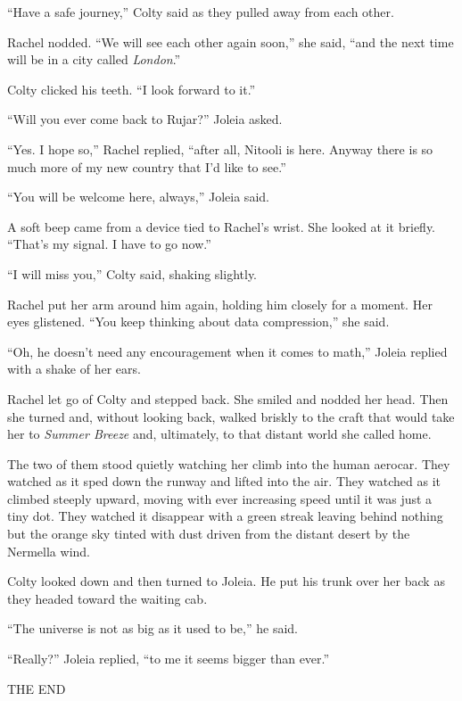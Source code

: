 ``Have a safe journey,'' Colty said as they pulled away from each other.

Rachel nodded. ``We will see each other again soon,'' she said, ``and the next time will be in a
city called \textit{London}.''

Colty clicked his teeth. ``I look forward to it.''

``Will you ever come back to Rujar?'' Joleia asked.

``Yes. I hope so,'' Rachel replied, ``after all, Nitooli is here. Anyway there is so much more
of my new country that I'd like to see.''

``You will be welcome here, always,'' Joleia said.

A soft beep came from a device tied to Rachel's wrist. She looked at it briefly. ``That's my
signal. I have to go now.''

``I will miss you,'' Colty said, shaking slightly.

Rachel put her arm around him again, holding him closely for a moment. Her eyes glistened. ``You
keep thinking about data compression,'' she said.

``Oh, he doesn't need any encouragement when it comes to math,'' Joleia replied with a shake of
her ears.

Rachel let go of Colty and stepped back. She smiled and nodded her head. Then she turned and,
without looking back, walked briskly to the craft that would take her to \textit{Summer Breeze}
and, ultimately, to that distant world she called home.

The two of them stood quietly watching her climb into the human aerocar. They watched as it sped
down the runway and lifted into the air. They watched as it climbed steeply upward, moving with
ever increasing speed until it was just a tiny dot. They watched it disappear with a green
streak leaving behind nothing but the orange sky tinted with dust driven from the distant desert
by the Nermella wind.

Colty looked down and then turned to Joleia. He put his trunk over her back as they headed
toward the waiting cab.

``The universe is not as big as it used to be,'' he said.

``Really?'' Joleia replied, ``to me it seems bigger than ever.''

THE END
